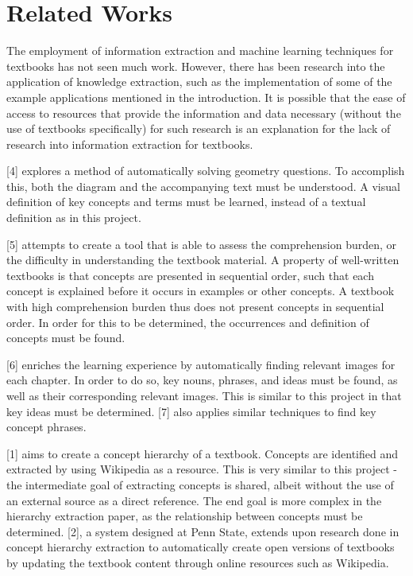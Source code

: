 \documentclass{article} %
\begin{document}
\section{Related Works}

The employment of information extraction and machine learning techniques for textbooks has not seen much work. However, there has been research into the application of knowledge extraction, such as the implementation of some of the example applications mentioned in the introduction. It is possible that the ease of access to resources that provide the information and data necessary (without the use of textbooks specifically) for such research is an explanation for the lack of research into information extraction for textbooks.

[4] explores a method of automatically solving geometry questions. To accomplish this, both the diagram and the accompanying text must be understood. A visual definition of key concepts and terms must be learned, instead of a textual definition as in this project.

[5] attempts to create a tool that is able to assess the comprehension burden, or the difficulty in understanding the textbook material. A property of well-written textbooks is that concepts are presented in sequential order, such that each concept is explained before it occurs in examples or other concepts. A textbook with high comprehension burden thus does not present concepts in sequential order. In order for this to be determined, the occurrences and definition of concepts must be found.

[6] enriches the learning experience by automatically finding relevant images for each chapter. In order to do so, key nouns, phrases, and ideas must be found, as well as their corresponding relevant images. This is similar to this project in that key ideas must be determined. [7] also applies similar techniques to find key concept phrases.

[1] aims to create a concept hierarchy of a textbook. Concepts are identified and extracted by using Wikipedia as a resource. This is very similar to this project - the intermediate goal of extracting concepts is shared, albeit without the use of an external source as a direct reference. The end goal is more complex in the hierarchy extraction paper, as the relationship between concepts must be determined. [2], a system designed at Penn State, extends upon research done in concept hierarchy extraction to automatically create open versions of textbooks by updating the textbook content through online resources such as Wikipedia.
\end{document}
